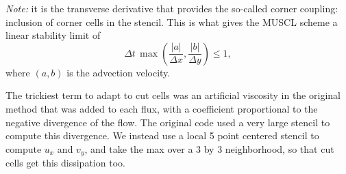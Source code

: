 

\textit{Note:} it is the transverse derivative that provides the so-called corner coupling:  inclusion
of corner cells in the stencil. This is what  gives  the MUSCL scheme a linear stability limit of
\begin{equation}
\label{eqn:bigcfllimit}
\Delta t \, \max \left (\frac{|a|}{\Delta x} , \frac{|b|}{\Delta y} \right) \leq 1,
\end{equation}
where $(a,b)$ is the advection velocity.  

The trickiest term to adapt to cut cells was an artificial viscosity in the original method that was 
added to each flux, with a
coefficient proportional to the negative divergence of the flow.  The original
code used a very large stencil to compute this divergence. We instead use a local 5
point centered stencil to compute $u_x$ and $v_y$, and take the max over a 3 by 3
neighborhood, so that cut cells get this dissipation too. 


